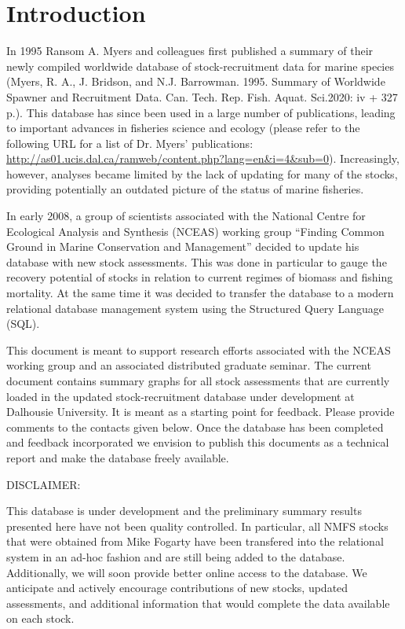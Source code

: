 \documentclass[a4paper,10pt,oneside]{book}
\author{Julia Baum \and Coil\'{i}n Minto \and Daniel Ricard \and Boris Worm}
\title{\begin{LARGE}Summary contents of the RAM II stock-recruitment database\end{LARGE} \\ \vspace{0.5cm} \textit{\begin{large}Document for NCEAS working group ``Finding Common Ground in Marine Conservation and Management''              \end{large}}}
\begin{document}
\maketitle
\tableofcontents

\chapter{Introduction}

In 1995 Ransom A. Myers and colleagues first published a summary of their newly compiled worldwide database of stock-recruitment data for marine species (Myers, R. A., J. Bridson, and N.J. Barrowman. 1995. Summary of Worldwide Spawner and Recruitment Data. Can. Tech. Rep. Fish. Aquat. Sci.2020: iv + 327 p.). This database has since been used in a large number of publications, leading to important advances in fisheries science and ecology (please refer to the following URL for a list of Dr. Myers' publications: \url{http://as01.ucis.dal.ca/ramweb/content.php?lang=en&i=4&sub=0}). Increasingly, however, analyses became limited by the lack of updating for many of the stocks, providing potentially an outdated picture of the status of marine fisheries. 

In early 2008, a group of scientists associated with the National Centre for Ecological Analysis and Synthesis (NCEAS) working group ``Finding Common Ground in Marine Conservation and Management'' decided to update his database with new stock assessments. This was done in particular to gauge the recovery potential of stocks in relation to current regimes of biomass and fishing mortality. At the same time it was decided to transfer the database to a modern relational database management system using the Structured Query Language (SQL).

This document is meant to support research efforts associated with the NCEAS working group and an associated distributed graduate seminar. The current document contains summary graphs for all stock assessments that are currently loaded in the updated stock-recruitment database under development at Dalhousie University. It is meant as a starting point for feedback. Please provide comments to the contacts given below. Once the database has been completed and feedback incorporated we envision to publish this documents as a technical report and make the database freely available.

\vspace{0.3cm}
\begin{Large}DISCLAIMER: \end{Large} This database is under development and the preliminary summary results presented here have not been quality controlled. In particular, all NMFS stocks that were obtained from Mike Fogarty have been transfered into the relational system in an ad-hoc fashion and are still being added to the database. Additionally, we will soon provide better online access to the database. We anticipate and actively encourage contributions of new stocks, updated assessments, and additional information that would complete the data available on each stock.
\end{document}

